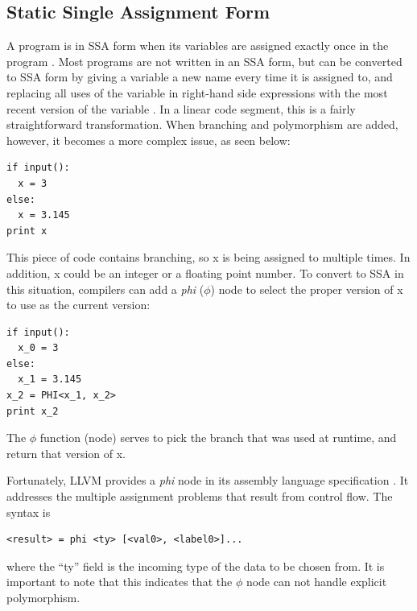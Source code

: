 \documentclass[11pt,twocolumn]{article}
\begin{document}


\subsection{Static Single Assignment Form}
\label{sec:SSAForm}

A program is in SSA form when its variables are assigned exactly once
in the program \cite{gcc-gnu.org}. Most programs are not written in an
SSA form, but can be converted to SSA form by giving a variable a new
name every time it is assigned to, and replacing all uses of the
variable in right-hand side expressions with the most recent version
of the variable \cite{brandis-mossenbock}. In a linear code segment,
this is a fairly straightforward transformation. When branching and
polymorphism are added, however, it becomes a more complex issue, as
seen below:

\begin{verbatim}
if input():
  x = 3
else:
  x = 3.145
print x
\end{verbatim}

This piece of code contains branching, so x is being assigned to
multiple times. In addition, x could be an integer or a floating point
number. To convert to SSA in this situation, compilers can add a
\emph{phi} ($\phi$) node to select the proper version of x to use as
the current version:

\begin{verbatim}
if input():
  x_0 = 3
else:
  x_1 = 3.145
x_2 = PHI<x_1, x_2>
print x_2
\end{verbatim}

The $\phi$ function (node) serves to pick the branch that was used at
runtime, and return that version of x.

Fortunately, LLVM provides a \emph{phi} node in its assembly language
specification \cite{lattner-llvmlangref}. It addresses the multiple
assignment problems that result from control flow. The syntax is

\begin{verbatim}
<result> = phi <ty> [<val0>, <label0>]...
\end{verbatim} 

where the ``ty'' field is the incoming type of the data to be chosen
from. It is important to note that this indicates that the $\phi$ node can not 
handle explicit polymorphism.
\end{document}
